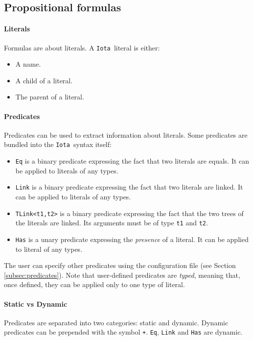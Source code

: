 \documentclass[10pt,a4paper]{article}
\newcommand{\ocaml}{\texttt}
\newcommand{\Iota}{\texttt{Iota }}
\begin{document}
\subsection{Propositional formulas}

\paragraph{Literals}
Formulas are about literals. A \Iota literal is either:
\begin{itemize}
\item A name.
\item A child of a literal.
\item The parent of a literal.
\end{itemize}

\paragraph{Predicates}
\label{para:predicates}
Predicates can be used to extract information about literals. Some predicates are bundled into the \Iota syntax itself:
\begin{itemize}
\item \ocaml{Eq} is a binary predicate expressing the fact that two literals are equals. It can be applied to literals of any types.
\item \ocaml{Link} is a binary predicate expressing the fact that two literals are linked. It can be applied to literals of any types.
\item \ocaml{TLink<t1,t2>} is a binary predicate expressing the fact that the two trees of the literals are linked. Its arguments must be of type \ocaml{t1} and \ocaml{t2}.
\item \ocaml{Has} is a unary predicate expressing the \emph{presence} of a literal. It can be applied to literal of any types.
\end{itemize}

The user can specify other predicates using the configuration file (see Section \ref{subsec:predicates}). Note that user-defined predicates are \emph{typed}, meaning that, once defined, they can be applied only to one type of literal.

\paragraph{Static vs Dynamic}
Predicates are separated into two categories: static and dynamic. Dynamic predicates can be prepended with the symbol \ocaml{+}. \ocaml{Eq}, \ocaml{Link} and \ocaml{Has} are dynamic.
\end{document}
